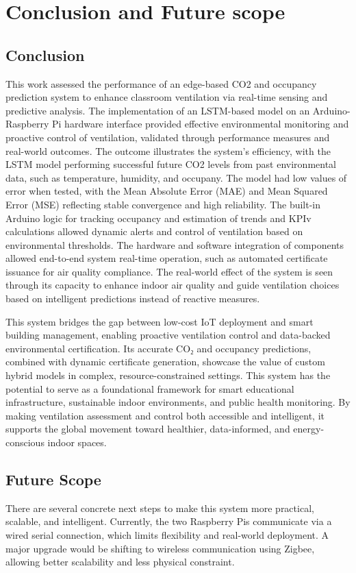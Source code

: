 \chapter{Conclusion and Future scope}
\section{Conclusion}
This work assessed the performance of an edge-based CO2 and occupancy prediction system to enhance classroom ventilation via real-time sensing and predictive analysis. The implementation of an LSTM-based model on an Arduino-Raspberry Pi hardware interface provided effective environmental monitoring and proactive control of ventilation, validated through performance measures and real-world outcomes. The outcome illustrates the system's efficiency, with the LSTM model performing successful future CO2 levels from past environmental data, such as temperature, humidity, and occupany. The model had low values of error when tested, with the Mean Absolute Error (MAE) and Mean Squared Error (MSE) reflecting stable convergence and high reliability. The built-in Arduino logic for tracking occupancy and estimation of trends and KPIv calculations allowed dynamic alerts and control of ventilation based on environmental thresholds. The hardware and software integration of components allowed end-to-end system real-time operation, such as automated certificate issuance for air quality compliance. The real-world effect of the system is seen through its capacity to enhance indoor air quality and guide ventilation choices based on intelligent predictions instead of reactive measures.

This system bridges the gap between low-cost IoT deployment and smart building management, enabling proactive ventilation control and data-backed environmental certification. Its accurate CO₂ and occupancy predictions, combined with dynamic certificate generation, showcase the value of custom hybrid models in complex, resource-constrained settings.
This system has the potential to serve as a foundational framework for smart educational infrastructure, sustainable indoor environments, and public health monitoring. By making ventilation assessment and control both accessible and intelligent, it supports the global movement toward healthier, data-informed, and energy-conscious indoor spaces.

\newpage
\section{Future Scope}
There are several concrete next steps to make this system more practical, scalable, and intelligent. Currently, the two Raspberry Pis communicate via a wired serial connection, which limits flexibility and real-world deployment. A major upgrade would be shifting to wireless communication using Zigbee, allowing better scalability and less physical constraint.

